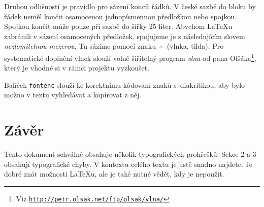 \documentclass[a4paper, twocolumn, 10pt]{article}
\begin{document}
Druhou odlišností je pravidlo pro sázení konců řádků.
V české sazbě do bloku by řádek neměl končit osamocenou jednopísmennou předložkou nebo spojkou.
Spojkou  končit může pouze při sazbě do šířky 25 liter.
Abychom \LaTeX u zabránili v sázení osamocených předložek, spojujeme je s následujícím slovem \emph{nezlomitelnou mezerou}.
Tu sázíme pomocí znaku~\textbf{\~}~(vlnka, tilda).
Pro systematické doplnění vlnek slouží volně šiřitelný program \emph{vlna} od pana Olšáka\footnote{Viz \texttt{\href{http://petr.olsak.net/ftp/olsak/vlna/}{http://petr.olsak.net/ftp/olsak/vlna/}}}, který je vhodné si v rámci projektu vyzkoušet.

Balíček \texttt{fontenc} slouží ke korektnímu kódovaní znaků s~diakritikou, aby bylo možno v textu vyhledávat a kopírovat z něj.


\section{Závěr}

Tento dokument schválně obsahuje několik typografických prohřešků.
Sekce 2 a 3 obsahují typografické chyby.
V kontextu celého textu je jistě snadno najdete.
Je dobré znát možnosti \LaTeX u, ale je také nutné vědět, kdy je nepoužít.
\end{document}
